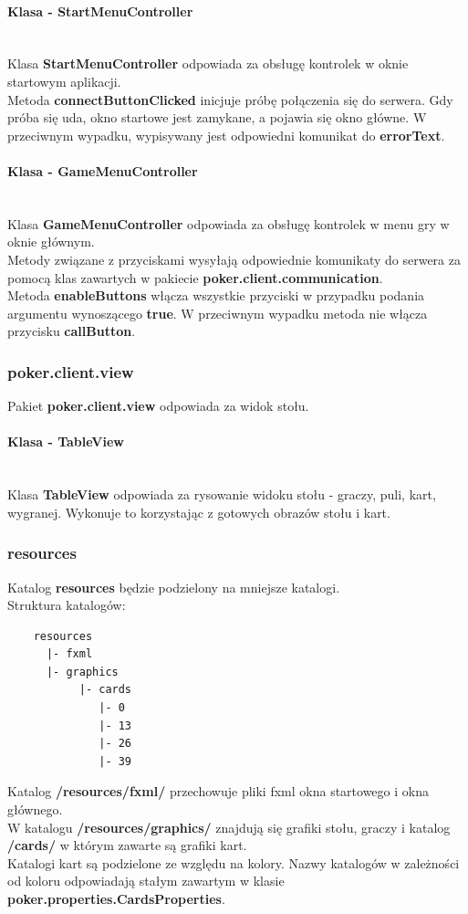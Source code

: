\documentclass{article}
\newcommand{\mparagraph}[1]{\paragraph{#1}\mbox{}\vspace{2mm}\\}
\begin{document}
            \mparagraph{Klasa - StartMenuController}
                Klasa \textbf{StartMenuController} odpowiada za obsługę kontrolek w oknie startowym aplikacji.
                \\
                Metoda \textbf{connectButtonClicked} inicjuje próbę połączenia się do serwera.
                Gdy próba się uda, okno startowe jest zamykane, a pojawia się okno główne.
                W przeciwnym wypadku, wypisywany jest odpowiedni komunikat do \textbf{errorText}.
            
            \mparagraph{Klasa - GameMenuController}
                Klasa \textbf{GameMenuController} odpowiada za obsługę kontrolek w menu gry w oknie głównym.
                \\
                Metody związane z przyciskami wysyłają odpowiednie komunikaty do serwera za pomocą klas zawartych w pakiecie \textbf{poker.client.communication}.
                \\
                Metoda \textbf{enableButtons} włącza wszystkie przyciski w przypadku podania argumentu wynoszącego \textbf{true}.
                W przeciwnym wypadku metoda nie włącza przycisku \textbf{callButton}.

        \subsubsection{poker.client.view}
            Pakiet \textbf{poker.client.view} odpowiada za widok stołu.
            
            \mparagraph{Klasa - TableView}
                Klasa \textbf{TableView} odpowiada za rysowanie widoku stołu - graczy, puli, kart, wygranej.
                Wykonuje to korzystając z gotowych obrazów stołu i kart.
                
        \subsubsection{resources}
            Katalog \textbf{resources} będzie podzielony na mniejsze katalogi.\\
            Struktura katalogów:
            \begin{verbatim}
    resources
      |- fxml
      |- graphics
           |- cards
              |- 0
              |- 13
              |- 26
              |- 39
            \end{verbatim}
            Katalog \textbf{/resources/fxml/} przechowuje pliki fxml okna startowego i okna głównego.\\
            W katalogu \textbf{/resources/graphics/} znajdują się grafiki stołu, graczy i katalog \textbf{/cards/} w którym zawarte są grafiki kart.\\
            Katalogi kart są podzielone ze względu na kolory.
            Nazwy katalogów w zależności od koloru odpowiadają stałym zawartym w klasie \textbf{poker.properties.CardsProperties}.
            
\end{document}
